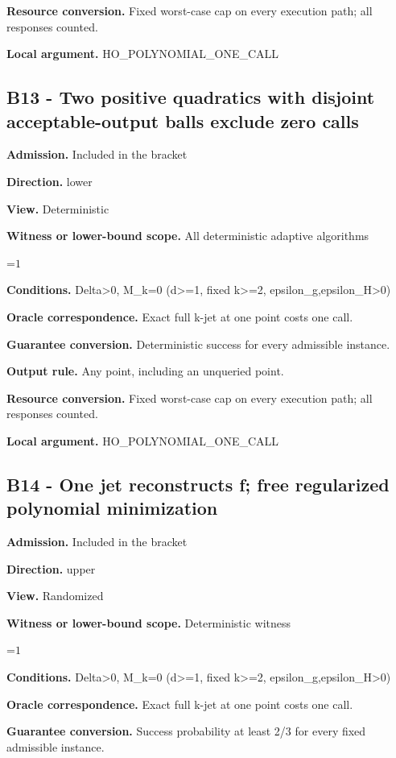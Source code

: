 \documentclass[10pt,a4paper]{article}
\newcommand{\AtlasMath}[1]{\par\begingroup\centering\setbox0=\hbox{$\displaystyle #1$}\ifdim\wd0>1.4\linewidth\typeout{ATLAS WIDE FORMULA: \the\wd0}\fi\ifdim\wd0>\linewidth\resizebox{\linewidth}{!}{\box0}\else\box0\fi\par\endgroup}
\begin{document}
\textbf{Resource conversion.} Fixed worst-case cap on every execution path; all responses counted.

\textbf{Local argument.} HO\_\allowbreak{}POLYNOMIAL\_\allowbreak{}ONE\_\allowbreak{}CALL

\subsection{B13 - Two positive quadratics with disjoint acceptable-output balls exclude zero calls}
\textbf{Admission.} Included in the bracket

\textbf{Direction.} lower

\textbf{View.} Deterministic

\textbf{Witness or lower-bound scope.} All deterministic adaptive algorithms

\AtlasMath{1}
\textbf{Conditions.} Delta>0, M\_\allowbreak{}k=0 (d>=1, fixed k>=2, epsilon\_\allowbreak{}g,epsilon\_\allowbreak{}H>0)

\textbf{Oracle correspondence.} Exact full k-jet at one point costs one call.

\textbf{Guarantee conversion.} Deterministic success for every admissible instance.

\textbf{Output rule.} Any point, including an unqueried point.

\textbf{Resource conversion.} Fixed worst-case cap on every execution path; all responses counted.

\textbf{Local argument.} HO\_\allowbreak{}POLYNOMIAL\_\allowbreak{}ONE\_\allowbreak{}CALL

\subsection{B14 - One jet reconstructs f; free regularized polynomial minimization}
\textbf{Admission.} Included in the bracket

\textbf{Direction.} upper

\textbf{View.} Randomized

\textbf{Witness or lower-bound scope.} Deterministic witness

\AtlasMath{1}
\textbf{Conditions.} Delta>0, M\_\allowbreak{}k=0 (d>=1, fixed k>=2, epsilon\_\allowbreak{}g,epsilon\_\allowbreak{}H>0)

\textbf{Oracle correspondence.} Exact full k-jet at one point costs one call.

\textbf{Guarantee conversion.} Success probability at least 2/3 for every fixed admissible instance.
\end{document}
